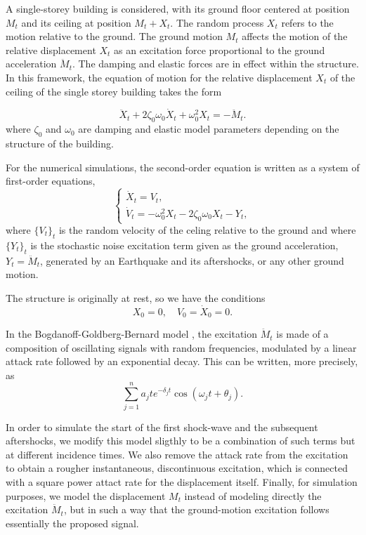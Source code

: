 \documentclass[reqno,12pt]{amsart}
\theoremstyle{plain} %
\theoremstyle{definition} %
\begin{document}
A single-storey building is considered, with its ground floor centered at position $M_t$ and its ceiling at position $M_t + X_t$. The random process $X_t$ refers to the motion relative to the ground. The ground motion $M_t$ affects the motion of the relative displacement $X_t$ as an excitation force proportional to the ground acceleration $\ddot M_t$. The damping and elastic forces are in effect within the structure. In this framework, the equation of motion for the relative displacement $X_t$ of the ceiling of the single storey building takes the form

\begin{equation}
    \label{mechanicalstructuremodel}
    \ddot X_t + 2\zeta_0\omega_0\dot X_t + \omega_0^2 X_t = - \ddot M_t.
\end{equation}
where $\zeta_0$ and $\omega_0$ are damping and elastic model parameters depending on the structure of the building.

For the numerical simulations, the second-order equation is written as a system of first-order equations,
\[
    \begin{cases}
        \dot X_t = V_t, \\
        \dot V_t = - \omega_0^2 X_t - 2\zeta_0\omega_0 X_t - Y_t,
    \end{cases}
\]
where $\{V_t\}_t$ is the random velocity of the celing relative to the ground and where $\{Y_t\}_t$ is the stochastic noise excitation term given as the ground acceleration, $Y_t = \ddot M_t$, generated by an Earthquake and its aftershocks, or any other ground motion.

The structure is originally at rest, so we have the conditions
\[
    X_0 = 0, \quad V_0 = \dot X_0 = 0.
\]

In the Bogdanoff-Goldberg-Bernard model \cite{BogdanoffGoldbergBernard1961}, 
the excitation $\ddot M_t$ is made of a composition of oscillating signals with random frequencies, modulated by a linear attack rate followed by an exponential decay. This can be written, more precisely, as
\[
    \sum_{j=1}^n a_j t e^{-\delta_j t}\cos(\omega_j t + \theta_j).
\]

In order to simulate the start of the first shock-wave and the subsequent aftershocks, we modify this model sligthly to be a combination of such terms but at different incidence times. We also remove the attack rate from the excitation to obtain a rougher instantaneous, discontinuous excitation, which is connected with a square power attact rate for the displacement itself. Finally, for simulation purposes, we model the displacement $M_t$ instead of modeling directly the excitation $\ddot M_t$, but in such a way that the ground-motion excitation follows essentially the proposed signal.
\end{document}
